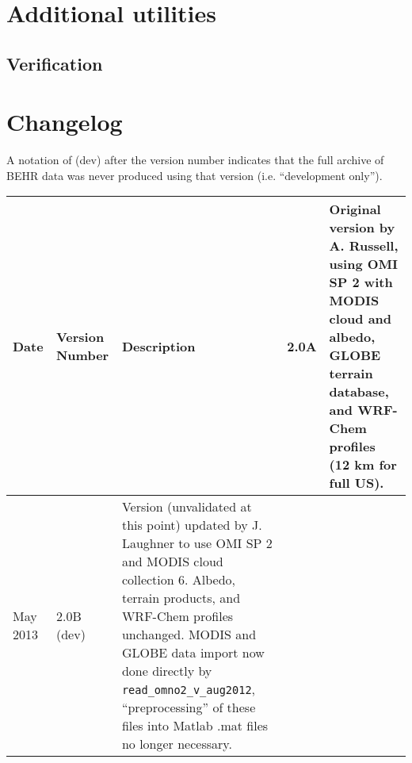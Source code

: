 \documentclass[12pt]{article}
\begin{document}
	

	
\section{Additional utilities}
	\subsection{Verification}
	
\section{Changelog}
	A notation of (dev) after the version number indicates that the full archive of BEHR data was never produced using that version (i.e. ``development only'').

\bgroup
\def\arraystretch{1.5}
	\begin{table}[h]
		\begin{longtabu} to \textwidth{| l | l | X |} \hline
			Date 		& 	Version Number		&	Description \endhead {}		&	2.0A				&	Original version by A. Russell, using OMI SP 2 with MODIS cloud and albedo, GLOBE terrain database, and WRF-Chem profiles (12 km for full US). \\ \hline
			May 2013	&	2.0B	 (dev)		&	Version (unvalidated at this point) updated by J. Laughner to use OMI SP 2 and MODIS cloud collection 6.  Albedo, terrain products, and WRF-Chem profiles unchanged.  MODIS and GLOBE data import now done directly by {\lstinline[breaklines=true]|read_omno2_v_aug2012|}, ``preprocessing'' of these files into Matlab .mat files no longer necessary. \\ \hline
		\end{longtabu}
	\end{table}
\egroup
\end{document}
